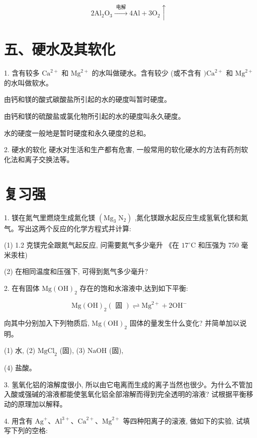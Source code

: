 \documentclass[10pt]{article}
\begin{document}
\[
2{\mathrm{{Al}}}_{2}{\mathrm{O}}_{3}\xrightarrow[]{\text{ 电解 }}4\mathrm{{Al}} + 3{\mathrm{O}}_{2} \uparrow
\]

\section*{五、硬水及其软化}

1. 含有较多 \({\mathrm{{Ca}}}^{2 + }\) 和 \({\mathrm{{Mg}}}^{2 + }\) 的水叫做硬水。含有较少 (或不含有 \(){\mathrm{{Ca}}}^{2 + }\) 和 \({\mathrm{{Mg}}}^{2 + }\) 的水叫做软水。

由钙和镁的酸式碳酸盐所引起的水的硬度叫暂时硬度。

由钙和镁的硫酸盐或氯化物所引起的水的硬度叫永久硬度。

水的硬度一般地是暂时硬度和永久硬度的总和。

2. 硬水的软化 硬水对生活和生产都有危害, 一般常用的软化硬水的方法有药剂软化法和离子交换法等。

\section*{复习强}

1. 镁在氮气里燃烧生成氮化镁 \(\left( {{\mathrm{{Mg}}}_{3}{\mathrm{\;N}}_{2}}\right)\) ,氮化镁跟水起反应生成氢氧化镁和氮气。写出这两个反应的化学方程式并计算:

(1) 1.2 克镁完全跟氮气起反应, 问需要氮气多少毫升 《在 \({17}^{ \circ }\mathrm{C}\) 和压强为 750 毫米汞柱)

(2) 在相同温度和压强下, 可得到氮气多少毫升?

2. 在有固体 \(\mathrm{{Mg}}{\left( \mathrm{{OH}}\right) }_{2}\) 存在的饱和水溶液中,达到如下平衡:

\[
\mathrm{{Mg}}{\left( \mathrm{{OH}}\right) }_{2}\left( \text{ 固 }\right) \rightleftharpoons {\mathrm{{Mg}}}^{2 + } + 2{\mathrm{{OH}}}^{ - }
\]

向其中分别加入下列物质后, \(\mathrm{{Mg}}{\left( \mathrm{{OH}}\right) }_{2}\) 固体的量发生什么变化? 并简单加以说明。

(1) 水, (2) \({\mathrm{{MgCl}}}_{2}\) (固), (3) \(\mathrm{{NaOH}}\) (固),

(4) 盐酸。

3. 氢氧化铝的溶解度很小, 所以由它电离而生成的离子当然也很少。为什么不管加入酸或强碱的溶液都能使氢氧化铝全部溶解而得到完全透明的溶液? 试根据平衡移动的原理加以解释。

4. 用含有 \({\mathrm{{Ag}}}^{ + }\text{、}{\mathrm{{Al}}}^{3 + }\text{、}{\mathrm{{Ca}}}^{2 + }\text{、}{\mathrm{{Mg}}}^{2 + }\) 等四种阳离子的滚液, 做如下的实验, 试填写下列的空格:
\end{document}
